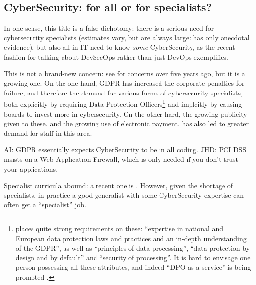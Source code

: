 \documentclass[sigconf,anonymous]{acmart}
\begin{document}
\subsection{CyberSecurity: for all or for specialists?}
In one sense, this title is a false dichotomy: there is a serious need for cybersecurity specialists (estimates vary, but are always large: \cite{JCNSS2018a} has only anecdotal evidence), but also all in IT need to know \emph{some} CyberSecurity, as the recent fashion for talking about DevSecOps rather than just DevOps exemplifies.

This is not a brand-new concern: see \cite{Parr2014a} for concerns over five years ago, but it is a growing one. On the one hand, GDPR has increased the corporate penalties for failure, and therefore the demand for various forms of cybersecurity specialists, both explicitly by requiring Data Protection Officers\footnote{\cite{EU292016a} places quite strong requirements on these: ``expertise in national and European data protection laws and practices and an in-depth understanding of the GDPR'', as well as ``principles of data processing'', ``data protection by design and by default'' and ``security of processing''. It is hard to envisage one person possessing all these attributes, and indeed ``DPO as a service'' is being promoted \cite{McCreanor2018d}.} and implcitly by causing boards to invest more in cybersecurity. On the other hard, the growing publicity given to these, and the growing use of electronic payment, has also led to greater demand for staff in this area.

AI: GDPR essentially expects CyberSecurity to be in all coding. 
JHD: PCI DSS insists on a Web Application Firewall, which is only needed if you don't trust your applications.


Specialist curricula abound: a recent one is \cite{ACMIEEEAISSIGSECIFIP}. However, given the shortage of specialists, in practice a good generalist with some CyberSecurity expertise can often get a ``specialist'' job.
\end{document}
